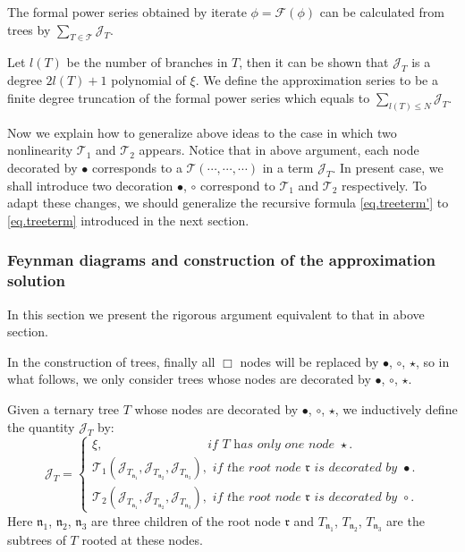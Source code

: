 The formal power series obtained by iterate $\phi=\mathcal{F}(\phi)$ can be calculated from trees by $\sum_{T\in \mathscr{T}} \mathcal{J}_T$.

Let $l(T)$ be the number of branches in $T$, then it can be shown that $\mathcal{J}_T$ is a degree $2l(T)+1$ polynomial of $\xi$. We define the approximation series to be a finite degree truncation of the formal power series which equals to $\sum_{l(T)\le N} \mathcal{J}_T$.

Now we explain how to generalize above ideas to the case in which two nonlinearity $\mathcal{T}_1$ and $\mathcal{T}_2$ appears.
Notice that in above argument, each node decorated by $\bullet$ corresponds to a $\mathcal{T}(\cdots,\cdots,\cdots)$ in a term $\mathcal{J}_{T}$. In present case, we shall introduce two decoration $\bullet$, $\circ$ correspond to $\mathcal{T}_1$ and $\mathcal{T}_2$ respectively. 
To adapt these changes, we should generalize the recursive formula \eqref{eq.treeterm'} to \eqref{eq.treeterm} introduced in the next section.


\subsubsection{Feynman diagrams and construction of the approximation solution} In this section we present the rigorous argument equivalent to that in above section. 

In the construction of trees, finally all $\Box$ nodes will be replaced by $\bullet$, $\circ$, $\star$, so in what follows, we only consider trees whose nodes are decorated by $\bullet$, $\circ$, $\star$.

\begin{defn}\label{def.treeterms} Given a ternary tree $T$ whose nodes are decorated by $\bullet$, $\circ$, $\star$,
we inductively define the quantity $\mathcal{J}_T$ by:
\begin{equation}\label{eq.treeterm}
    \mathcal{J}_T=
    \begin{cases}
    \xi, \qquad\qquad\qquad\qquad \textit{ if }T\textit{ has only one node }\star.
    \\
    \mathcal{T}_1(\mathcal{J}_{T_{\mathfrak{n}_1}}, \mathcal{J}_{T_{\mathfrak{n}_2}}, \mathcal{J}_{T_{\mathfrak{n}_3}}), \textit{ if the root node }\mathfrak{r}\textit{ is decorated by }\bullet.
    \\
    \mathcal{T}_2(\mathcal{J}_{T_{\mathfrak{n}_1}}, \mathcal{J}_{T_{\mathfrak{n}_2}}, \mathcal{J}_{T_{\mathfrak{n}_3}}), \textit{ if the root node }\mathfrak{r}\textit{ is decorated by }\circ.
    \end{cases}
\end{equation}
Here $\mathfrak{n}_1$, $\mathfrak{n}_2$, $\mathfrak{n}_3$ are three children of the root node $\mathfrak{r}$ and $T_{\mathfrak{n}_1}$, $T_{\mathfrak{n}_2}$, $T_{\mathfrak{n}_3}$ are the subtrees of $T$ rooted at these nodes.
\end{defn}


